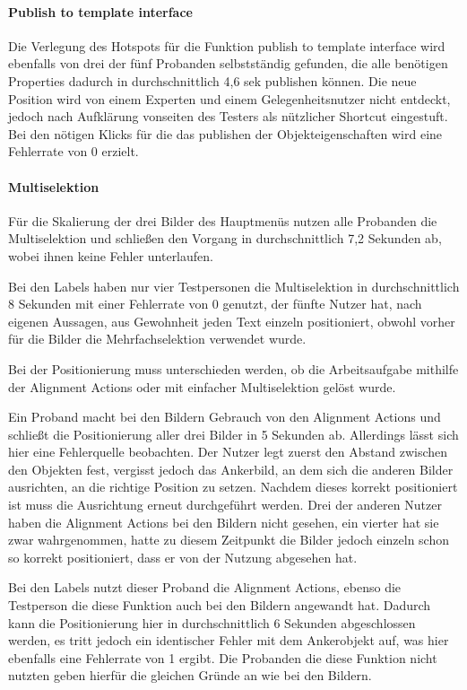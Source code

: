 \paragraph{Publish to template interface}
Die Verlegung des Hotspots für die Funktion \glqq publish to template interface\grqq{} wird ebenfalls von drei der fünf Probanden selbstständig gefunden, die alle benötigen Properties dadurch in durchschnittlich 4,6 sek publishen können.
Die neue Position wird von einem Experten und einem Gelegenheitsnutzer nicht entdeckt, jedoch nach Aufklärung vonseiten des Testers als nützlicher Shortcut eingestuft.
Bei den nötigen Klicks für die das publishen der Objekteigenschaften wird eine Fehlerrate von 0 erzielt.

\paragraph{Multiselektion}
Für die Skalierung der drei Bilder des Hauptmenüs nutzen alle Probanden die Multiselektion und schließen den Vorgang in durchschnittlich 7,2 Sekunden ab, wobei ihnen keine Fehler unterlaufen.

Bei den Labels haben nur vier Testpersonen die Multiselektion in durchschnittlich 8 Sekunden mit einer Fehlerrate von 0 genutzt, der fünfte Nutzer hat, nach eigenen Aussagen, aus Gewohnheit jeden Text einzeln positioniert, obwohl vorher für die Bilder die Mehrfachselektion verwendet wurde.

Bei der Positionierung muss unterschieden werden, ob die Arbeitsaufgabe mithilfe der Alignment Actions oder mit einfacher Multiselektion gelöst wurde.

Ein Proband macht bei den Bildern Gebrauch von den Alignment Actions und schließt die Positionierung aller drei Bilder in 5 Sekunden ab.
Allerdings lässt sich hier eine Fehlerquelle beobachten.
Der Nutzer legt zuerst den Abstand zwischen den Objekten fest, vergisst jedoch das Ankerbild, an dem sich die anderen Bilder ausrichten, an die richtige Position zu setzen.
Nachdem dieses korrekt positioniert ist muss die Ausrichtung erneut durchgeführt werden.
Drei der anderen Nutzer haben die Alignment Actions bei den Bildern nicht gesehen, ein vierter hat sie zwar wahrgenommen, hatte zu diesem Zeitpunkt die Bilder jedoch einzeln schon so korrekt positioniert, dass er von der Nutzung abgesehen hat.

Bei den Labels nutzt dieser Proband die Alignment Actions, ebenso die Testperson die diese Funktion auch bei den Bildern angewandt hat.
Dadurch kann die Positionierung hier in durchschnittlich 6 Sekunden abgeschlossen werden, es tritt jedoch ein identischer Fehler mit dem Ankerobjekt auf, was hier ebenfalls eine Fehlerrate von 1 ergibt.
Die Probanden die diese Funktion nicht nutzten geben hierfür die gleichen Gründe an wie bei den Bildern.


